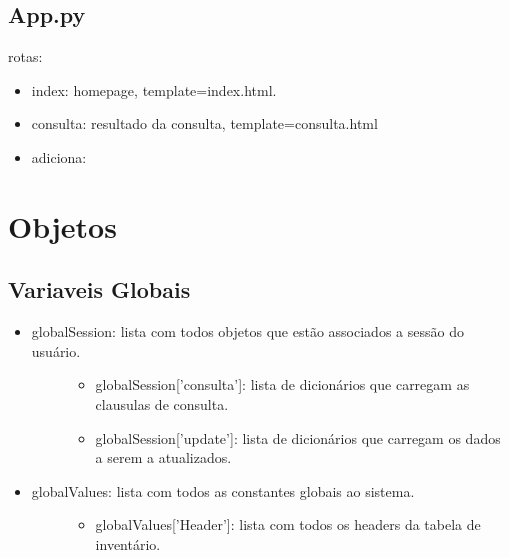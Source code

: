 \documentclass[letterpaper,10pt,openany,oneside,portuges]{sphinxmanual}
\begin{document}
\section{App.py}
\label{\detokenize{classes:app-py}}
rotas:
\begin{itemize}
\item {} 
index: homepage, template=index.html.

\item {} 
consulta: resultado da consulta, template=consulta.html

\item {} 
adiciona:

\end{itemize}


\chapter{Objetos}
\label{\detokenize{objetos::doc}}\label{\detokenize{objetos:objetos}}

\section{Variaveis Globais}
\label{\detokenize{objetos:variaveis-globais}}\begin{itemize}
\item {} \begin{description}
\item[{globalSession: lista com todos objetos que estão associados a sessão do usuário.}] \leavevmode\begin{itemize}
\item {} 
globalSession{[}'consulta'{]}: lista de dicionários que carregam as clausulas de consulta.

\item {} 
globalSession{[}'update'{]}: lista de dicionários que carregam os dados a serem a atualizados.

\end{itemize}

\end{description}

\item {} \begin{description}
\item[{globalValues: lista com todos as constantes globais ao sistema.}] \leavevmode\begin{itemize}
\item {} 
globalValues{[}'Header'{]}: lista com todos os headers da tabela de inventário.

\end{itemize}

\end{description}

\end{itemize}
\end{document}
